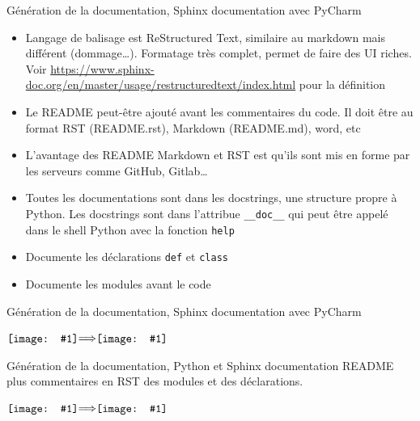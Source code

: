 \documentclass{beamer}
\newcommand*{\vcenterimage}[1]{\vcenter{\hbox{\texttt{[image: \#1]}}}}
\newcommand*{\vcenterarrow}{\vcenter{\hbox{$\Longrightarrow$}}}
\begin{document}
    \begin{frame}[fragile]{Génération de la documentation, Sphinx documentation avec PyCharm}

        \begin{itemize}

            \item Langage de balisage est ReStructured Text, similaire au markdown mais différent (dommage\ldots). Formatage très complet, permet de faire des UI riches.
            Voir \url{https://www.sphinx-doc.org/en/master/usage/restructuredtext/index.html} pour la définition
            \item Le README peut-être ajouté avant les commentaires du code.
            Il doit être au format RST (README.rst), Markdown (README.md), word, etc
            \item L'avantage des README Markdown et RST est qu'ils sont mis en forme par les serveurs comme GitHub, Gitlab\ldots
            \item Toutes les documentations sont dans les docstrings, une structure propre à Python.
            Les docstrings sont dans l'attribue \lstinline{__doc__} qui peut être appelé dans le shell Python avec la fonction \lstinline{help}
            \item Documente les déclarations \lstinline{def} et \lstinline{class}
            \item Documente les modules avant le code

        \end{itemize}

    \end{frame}

    \begin{frame}{Génération de la documentation, Sphinx documentation avec PyCharm}

        \centering
        $\vcenterimage{image/python-rst}\vcenterarrow\vcenterimage{image/readme-example}$

    \end{frame}

    \begin{frame}{Génération de la documentation, Python et Sphinx documentation}
        README plus commentaires en RST des modules et des déclarations.

        \centering
        $\vcenterimage{image/python-rst-2}\vcenterarrow\vcenterimage{image/readme-plus-code}$

    \end{frame}
\end{document}
